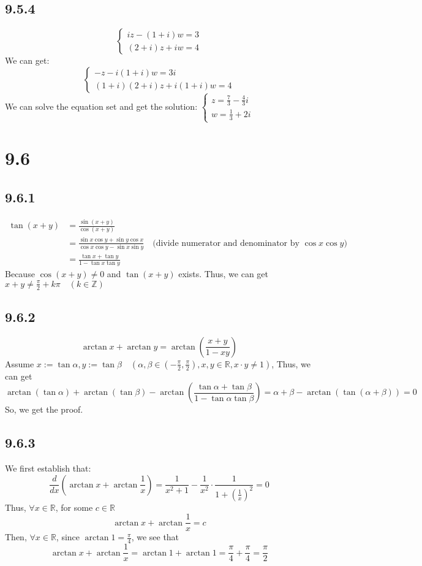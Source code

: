 \documentclass[11pt,twoside,a4paper]{article}
\begin{document}
\subsection{9.5.4}
$$
\begin{cases}
    iz-(1+i)w=3\\
    (2+i)z+iw=4
\end{cases}
$$
We can get:
$$
\begin{cases}
    -z-i(1+i)w=3i\\
    (1+i)(2+i)z+i(1+i)w=4
\end{cases}
$$
We can solve the equation set and get the solution:
$
\begin{cases}
    \displaystyle
    z=\frac{7}{3}-\frac{4}{3}i\\
    \displaystyle
    w=\frac{1}{3}+2i
\end{cases}
$

\section{9.6}
\subsection{9.6.1}
\begin{equation}
    \begin{aligned}
    \tan (x+y)&=\frac{\sin (x+y)}{\cos (x+y)} \\
        &=  \frac{\sin x \cos y+\sin y \cos x}{\cos x \cos y-\sin x\sin y} 
        \quad\text{(divide numerator and denominator by $\cos x \cos y$)}\\
        &=\frac{\tan x+\tan y}{1-\tan x\tan y}
    \end{aligned}
\end{equation}
Because $\cos (x+y) \neq 0$ and $\tan (x+y)$ exists. Thus, we can get 
$\displaystyle x+y\neq \frac{\pi}{2}+k\pi\quad (k\in \mathbb{Z})$

\subsection{9.6.2}
$$\arctan x+\arctan y=\arctan (\frac{x+y}{1-xy})$$
Assume $\displaystyle x:=\tan \alpha ,y:=\tan \beta 
\quad (\alpha ,\beta \in (-\frac{\pi}{2},\frac{\pi}{2}),x,y\in \mathbb{R},x\cdot y \neq1)$, 
Thus, we can get 
$$
\arctan (\tan \alpha )+\arctan (\tan \beta )
-\arctan (\frac{\tan \alpha +\tan \beta }{1- \tan \alpha \tan \beta })
=\alpha +\beta -\arctan (\tan (\alpha +\beta ))=0
$$
So, we get the proof.

\subsection{9.6.3}
We first establish that:
$$
\frac{d}{dx}(\arctan x+ \arctan \frac{1}{x})=\frac{1}{x^2+1}-\frac{1}{x^2}\cdot\frac{1}{1+(\frac{1}{x})^2}=0
$$
Thus, $\forall x \in \mathbb{R}$, for some $c \in \mathbb{R}$
$$
\arctan x +\arctan\frac{1}{x}=c
$$
Then, $\forall x\in \mathbb{R}$, 
since $\displaystyle \arctan 1=\frac{\pi}{4}$, we see that
$$
\arctan x+ \arctan \frac{1}{x}=\arctan 1+ \arctan 1=\frac{\pi}{4}+\frac{\pi}{4}=\frac{\pi}{2}
$$
\end{document}
